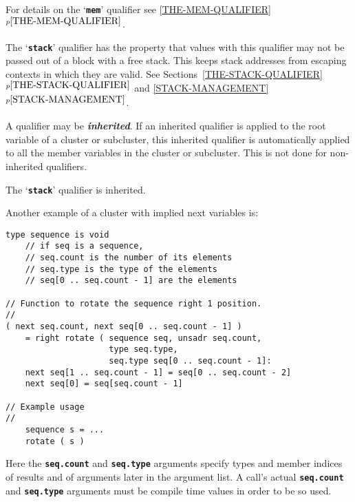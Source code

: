 \documentclass[12pt]{article}
\newcommand{\TT}[1]{{\tt \bfseries #1}}
\newcommand{\ikey}[2]{{\bf \em #1}\index{#2}}
\newcommand{\itemref}[1]{\ref{#1}$^{p\pageref{#1}}$}
\newenvironment{indpar}[1][0.3in]%
	{\begin{list}{}%
		     {\setlength{\itemsep}{0in}%
		      \setlength{\topsep}{0in}%
		      \setlength{\parsep}{1ex}%
		      \setlength{\labelwidth}{#1}%
		      \setlength{\leftmargin}{#1}%
		      \addtolength{\leftmargin}{\labelsep}}%
	 \item}%
	{\end{list}}
\begin{document}
For details on the `\TT{mem}' qualifier see \itemref{THE-MEM-QUALIFIER}.

The `\TT{stack}' qualifier has the property that values with
this qualifier may not be passed out of a block with a free
stack.  This keeps stack addresses from escaping contexts in
which they are valid.  See Sections~\itemref{THE-STACK-QUALIFIER} and
\itemref{STACK-MANAGEMENT}.

A qualifier may be \ikey{inherited}{qualifier}\label{INHERITED-QUALIFIER}.
If an inherited qualifier
is applied to the root variable of a cluster
or subcluster, this inherited qualifier is automatically applied to all
the member variables in the cluster or subcluster.  This is not done
for non-inherited qualifiers.

The `\TT{stack}' qualifier is inherited.

Another example of a cluster with implied next variables is:
\begin{indpar}\begin{verbatim}
type sequence is void
    // if seq is a sequence,
    // seq.count is the number of its elements
    // seq.type is the type of the elements
    // seq[0 .. seq.count - 1] are the elements

// Function to rotate the sequence right 1 position.
//
( next seq.count, next seq[0 .. seq.count - 1] )
    = right rotate ( sequence seq, unsadr seq.count,
                     type seq.type,
                     seq.type seq[0 .. seq.count - 1]:
    next seq[1 .. seq.count - 1] = seq[0 .. seq.count - 2]
    next seq[0] = seq[seq.count - 1]

// Example usage
//
    sequence s = ...
    rotate ( s )
\end{verbatim}\end{indpar}
Here the \TT{seq.count} and \TT{seq.type} arguments
specify types and member indices
of results and of arguments later in the argument list.  A call's actual
\TT{seq.count} and \TT{seq.type} arguments must be compile time values
in order to be so used.
\end{document}
